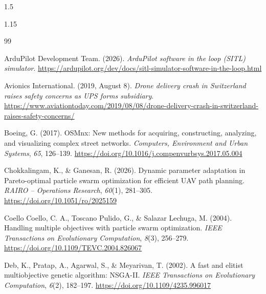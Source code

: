 \documentclass[a4paper, 14pt, oneside]{Thesis}
\begin{document}

\mainmatter	  %
\pagestyle{myheadings}

\begin{spacing}{1.5}

\clearpage
{}
\begin{spacing}{1.15}
\small
\begin{thebibliography}{99}
\setlength{\itemsep}{2pt}

ArduPilot Development Team. (2026). \textit{ArduPilot software in the loop (SITL) simulator}. \url{https://ardupilot.org/dev/docs/sitl-simulator-software-in-the-loop.html}

Avionics International. (2019, August 8). \textit{Drone delivery crash in Switzerland raises safety concerns as UPS forms subsidiary}. \url{https://www.aviationtoday.com/2019/08/08/drone-delivery-crash-in-switzerland-raises-safety-concerns/}

Boeing, G. (2017). OSMnx: New methods for acquiring, constructing, analyzing, and visualizing complex street networks. \textit{Computers, Environment and Urban Systems}, \textit{65}, 126--139. \url{https://doi.org/10.1016/j.compenvurbsys.2017.05.004}

Chokkalingam, K., \& Ganesan, R. (2026). Dynamic parameter adaptation in Pareto-optimal particle swarm optimization for efficient UAV path planning. \textit{RAIRO -- Operations Research}, \textit{60}(1), 281--305. \url{https://doi.org/10.1051/ro/2025159}

Coello Coello, C. A., Toscano Pulido, G., \& Salazar Lechuga, M. (2004). Handling multiple objectives with particle swarm optimization. \textit{IEEE Transactions on Evolutionary Computation}, \textit{8}(3), 256--279. \url{https://doi.org/10.1109/TEVC.2004.826067}

Deb, K., Pratap, A., Agarwal, S., \& Meyarivan, T. (2002). A fast and elitist multiobjective genetic algorithm: NSGA-II. \textit{IEEE Transactions on Evolutionary Computation}, \textit{6}(2), 182--197. \url{https://doi.org/10.1109/4235.996017}


\end{thebibliography}
\end{spacing}
\end{spacing}
\end{document}
